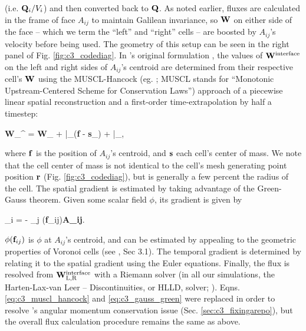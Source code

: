 \noindent (i.e. ${\bf Q}_i/V_i$) and then converted back to ${\bf Q}$.  As noted earlier, fluxes are calculated in the frame of face $A_{ij}$ to maintain Galilean invariance, so ${\bf W}$ on either side of the face -- which we term the ``left'' and ``right'' cells -- are boosted by $A_{ij}$'s velocity before being used.  The geometry of this setup can be seen in the right panel of Fig. \ref{fig:c3_codediag}. In \arepo's original formulation \citep{spri10}, the values of ${\bf W}^\mathrm{interface}$ on the left and right sides of $A_{ij}$'s centroid are determined from their respective cell's ${\bf W}$ using the MUSCL-Hancock (eg. \citealt{vlee06}; MUSCL stands for ``Monotonic Upstream-Centered Scheme for Conservation Laws'')  approach of a piecewise linear spatial reconstruction and a first-order time-extrapolation by half a timestep:

\eqbegin
{\bf W}_^ = {\bf W}_ + {\bf {}}\Bigr|_({\bf f} - {\bf s}_) + {\bf {}}\Bigr|_,
\label{eq:c3_muscl_hancock}
\eqend

\noindent where ${\bf f}$ is the position of $A_{ij}$'s centroid, and ${\bf s}$ each cell's center of mass.  We note that the cell center of mass is not identical to the cell's mesh generating point position ${\bf r}$ (Fig. \ref{fig:c3_codediag}), but is generally a few percent the radius of the cell.  The spatial gradient is estimated by taking advantage of the Green-Gauss theorem.  Given some scalar field $\phi$, its gradient is given by

\eqbegin
\left\langle \nabla \phi \right\rangle_i = - \sum_j \phi({\bf f}_{ij}){\bf A_{ij}}.
\label{eq:c3_gauss_green}
\eqend

\noindent $\phi({\bf f}_{ij})$ is $\phi$ at $A_{ij}$'s centroid, and can be estimated by appealing to the geometric properties of Voronoi cells (see \cite{spri10}, Sec 3.1).  The temporal gradient is determined by relating it to the spatial gradient using the Euler equations.  Finally, the flux is resolved from ${\bf W}_\mathrm{L,R}^\mathrm{interface}$ with a Riemann solver (in all our simulations, the Harten-Lax-van Leer -- Discontinuities, or HLLD, solver; \citealt{miyok05}).  Eqns. \ref{eq:c3_muscl_hancock} and \ref{eq:c3_gauss_green} were replaced in \cite{pakm+16} order to resolve \arepo's angular momentum conservation issue (Sec. \ref{sec:c3_fixingarepo}), but the overall flux calculation procedure remains the same as above.

